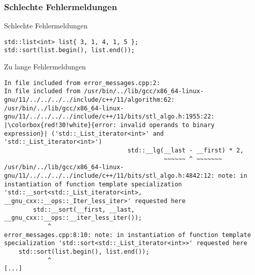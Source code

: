\subsubsection{Schlechte Fehlermeldungen}

\begin{frame}[fragile]{Schlechte Fehlermeldungen}

    \begin{verbatim}
std::list<int> list{ 3, 1, 4, 1, 5 };
std::sort(list.begin(), list.end());
    \end{verbatim}
\end{frame}

\setlength{\fboxsep}{0.1pt}
\begin{frame}[fragile]{Zu lange Fehlermeldungen}
    \begin{verbatim}
In file included from error_messages.cpp:2:
In file included from /usr/bin/../lib/gcc/x86_64-linux-gnu/11/../../../../include/c++/11/algorithm:62:
/usr/bin/../lib/gcc/x86_64-linux-gnu/11/../../../../include/c++/11/bits/stl_algo.h:1955:22:
|\colorbox{red!30!white}{error: invalid operands to binary expression}| ('std::_List_iterator<int>' and 'std::_List_iterator<int>')
                                  std::__lg(__last - __first) * 2,
                                            ~~~~~~ ^ ~~~~~~~
/usr/bin/../lib/gcc/x86_64-linux-gnu/11/../../../../include/c++/11/bits/stl_algo.h:4842:12: note: in instantiation of function template specialization 'std::__sort<std::_List_iterator<int>, __gnu_cxx::__ops::_Iter_less_iter>' requested here
        std::__sort(__first, __last, __gnu_cxx::__ops::__iter_less_iter());
            ^
error_messages.cpp:8:10: note: in instantiation of function template specialization 'std::sort<std::_List_iterator<int>>' requested here
    std::sort(list.begin(), list.end());
            ^
[...]
\end{verbatim}

\end{frame}
